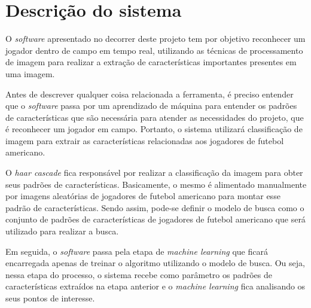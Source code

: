 \section{\textbf{Descrição do sistema}}
\label{descricao-do-sistema}


O \textit{software} apresentado no decorrer deste projeto tem por objetivo reconhecer um jogador dentro de campo em tempo real, utilizando as técnicas de processamento de imagem para realizar a extração de características importantes presentes em uma imagem.

Antes de descrever qualquer coisa relacionada a ferramenta, é preciso entender que o \textit{software} passa por um aprendizado de máquina para entender os padrões de características que são necessária para atender as necessidades do projeto, que é reconhecer um jogador em campo. Portanto, o sistema utilizará classificação de imagem para extrair as características relacionadas aos jogadores de futebol americano.

O \textit{haar cascade} fica responsável por realizar a classificação da imagem para obter seus padrões de características. Basicamente, o mesmo é alimentado manualmente por imagens aleatórias de jogadores de futebol americano para montar esse padrão de características. Sendo assim, pode-se definir o modelo de busca como o conjunto de padrões de características de jogadores de futebol americano que será utilizado para realizar a busca.

Em seguida, o \textit{software} passa pela etapa de \textit{machine learning} que ficará encarregada apenas de treinar o algoritmo utilizando o modelo de busca. Ou seja, nessa etapa do processo, o sistema recebe como parâmetro os padrões de características extraídos na etapa anterior e o \textit{machine learning} fica analisando os seus pontos de interesse.

